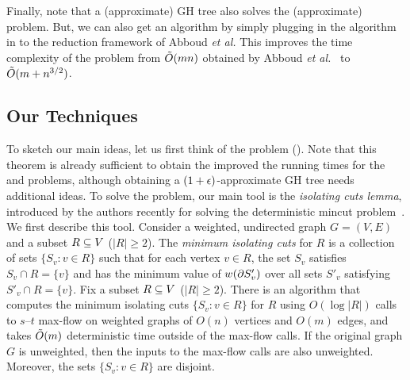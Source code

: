 Finally, note that a (approximate) GH tree also solves the (approximate) \apc problem. But, we can also get an \apc algorithm by simply plugging in the \ssc algorithm in  to the reduction framework of Abboud {\em et al.} This improves the time complexity of the \apc problem from $\tilde{O}(mn)$ obtained by  Abboud {\em et al.}~\cite{AbboudKT20b} to $\tilde{O}(m + n^{3/2})$.


\subsection{Our Techniques}

To sketch our main ideas, let us first think of the \ct problem (). Note that this theorem is already sufficient to obtain the improved the running times for the \ssc and \apc problems, although obtaining a $(1+\epsilon)$-approximate GH tree needs additional ideas. To solve the \ct problem, our main tool is the {\em isolating cuts lemma}, introduced by the authors recently for solving the deterministic mincut problem~\cite{LiP20}. We first describe this tool.
%
Consider a weighted, undirected graph $G=(V,E)$ and a subset $R\subseteq V$ ($|R|\ge2$). The \emph{minimum isolating cuts} for $R$ is a collection of sets $\{S_v:v\in R\}$ such that for each vertex $v\in R$, the set $S_v$ satisfies $S_v\cap R=\{v\}$ and has the minimum value of $w(\partial S'_v)$ over all sets $S'_v$ satisfying $S'_v\cap R=\{v\}$.
\ED
%
%
Fix a subset $R\subseteq V$ ($|R|\ge2$). There is an algorithm that computes the minimum isolating cuts $\{S_v:v\in R\}$ for $R$ using $O(\log|R|)$ calls to $s$--$t$ max-flow on weighted graphs of $O(n)$ vertices and $O(m)$ edges, and takes $\tilde{O}(m)$ deterministic time outside of the max-flow calls. If the original graph $G$ is unweighted, then the inputs to the max-flow calls are also unweighted. Moreover, the sets $\{S_v:v\in R\}$ are disjoint.
\EL
%
